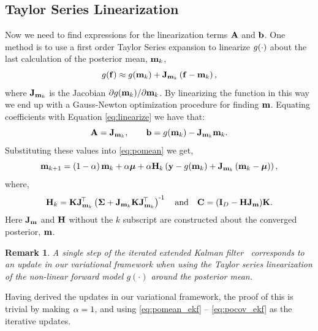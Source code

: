 \documentclass{article} %
\newtheorem{remark}{Remark}
\begin{document}
\subsection{Taylor Series Linearization}

Now we need to find expressions for the linearization terms $\mathbf{A}$ and
$\mathbf{b}$. One method is to use a first order Taylor Series expansion to 
linearize $g\!\left({{\cdot}}\right)$ about the last calculation of the posterior mean, 
$\mathbf{m}_k$,
\begin{equation}
    g\!\left({{\mathbf{f}}}\right) \approx g\!\left({{\mathbf{m}_k}}\right) +
    \mathbf{J}_{\mathbf{m}_k}\left({\mathbf{f} - \mathbf{m}_k}\right),
\end{equation}
where $\mathbf{J}_{\mathbf{m}_k}$ is the Jacobian $\partial g\!\left({{\mathbf{m}_k}}\right)\!/
\partial\mathbf{m}_k$. By linearizing the function in this way we end up with a
Gauss-Newton optimization procedure for finding $\mathbf{m}$.  Equating
coefficients with Equation \eqref{eq:linearize} we have that:
\begin{equation}
    \mathbf{A} = \mathbf{J}_{\mathbf{m}_k}, \qquad \mathbf{b} = g\!\left({{\mathbf{m}_k}}\right) -
    \mathbf{J}_{\mathbf{m}_k}\mathbf{m}_k.
\end{equation}
Substituting these values into \eqref{eq:pomean} we get,
\begin{equation}
    \mathbf{m}_{k+1} = \left({1-\alpha}\right)\mathbf{m}_k + \alpha\boldsymbol{\mu} 
        + \alpha\mathbf{H}_k\left({\mathbf{y} - g\!\left({{\mathbf{m}_k}}\right) 
        + \mathbf{J}_{\mathbf{m}_k}\left({\mathbf{m}_k - \boldsymbol{\mu}}\right)}\right),
    \label{eq:pomean_ekf}
\end{equation}
where,
\begin{equation}
    \mathbf{H}_k = \mathbf{K}\mathbf{J}_{\mathbf{m}_k}^{\!\top}\left({\boldsymbol{\Sigma} +
        \mathbf{J}_{\mathbf{m}_k}\mathbf{K}\mathbf{J}_{\mathbf{m}_k}^{\!\top}}\right)^{\text{-}1}
    \quad\text{and}\quad
    \mathbf{C} = \left({\mathbf{I}_{D} - \mathbf{H}\mathbf{J}_{\mathbf{m}}}\right)\!\mathbf{K}.
    \label{eq:pocov_ekf}
\end{equation}
Here $\mathbf{J}_{\mathbf{m}}$ and $\mathbf{H}$ without the $k$ subscript are constructed
about the converged posterior, $\mathbf{m}$. 
%
\begin{remark}
A single step of the  iterated extended Kalman filter~\cite{Bell1993,
    Sibley2006} corresponds to an update  in our variational framework when
using the Taylor series linearization of the non-linear forward model
$g(\cdot)$ around the posterior mean.
\end{remark}
Having derived the updates in our variational framework, the proof of this is
trivial by making  $\alpha =1$, and using \eqref{eq:pomean_ekf} --
\eqref{eq:pocov_ekf} as the iterative updates.
\end{document}
